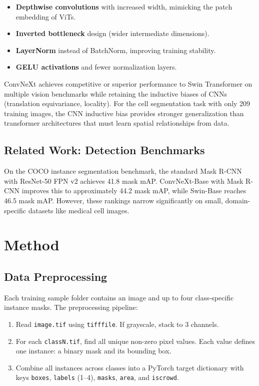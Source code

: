 \documentclass[12pt, a4paper]{article}
\begin{document}
\begin{itemize}
    \item \textbf{Depthwise convolutions} with increased width, mimicking the patch embedding of ViTs.
    \item \textbf{Inverted bottleneck} design (wider intermediate dimensions).
    \item \textbf{LayerNorm} instead of BatchNorm, improving training stability.
    \item \textbf{GELU activations} and fewer normalization layers.
\end{itemize}

ConvNeXt achieves competitive or superior performance to Swin Transformer \cite{liu2021} on multiple vision benchmarks while retaining the inductive biases of CNNs (translation equivariance, locality). For the cell segmentation task with only 209 training images, the CNN inductive bias provides stronger generalization than transformer architectures that must learn spatial relationships from data.

\subsection{Related Work: Detection Benchmarks}
On the COCO instance segmentation benchmark, the standard Mask R-CNN with ResNet-50 FPN v2 achieves 41.8 mask mAP. ConvNeXt-Base with Mask R-CNN improves this to approximately 44.2 mask mAP, while Swin-Base reaches 46.5 mask mAP. However, these rankings narrow significantly on small, domain-specific datasets like medical cell images.

\section{Method}

\subsection{Data Preprocessing}
Each training sample folder contains an image and up to four class-specific instance masks. The preprocessing pipeline:
\begin{enumerate}
    \item Read \texttt{image.tif} using \texttt{tifffile}. If grayscale, stack to 3 channels.
    \item For each \texttt{classN.tif}, find all unique non-zero pixel values. Each value defines one instance: a binary mask and its bounding box.
    \item Combine all instances across classes into a PyTorch target dictionary with keys \texttt{boxes}, \texttt{labels} (1--4), \texttt{masks}, \texttt{area}, and \texttt{iscrowd}.
\end{enumerate}
\end{document}
